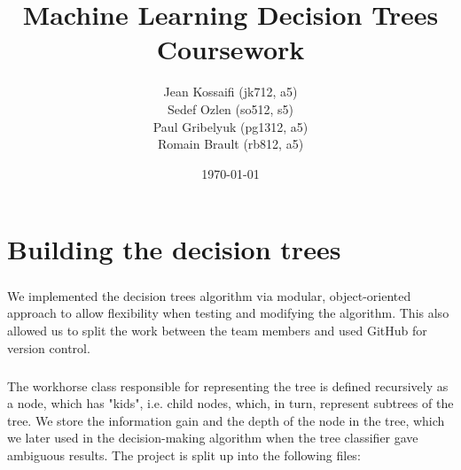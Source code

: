 \documentclass[a4paper,12pt,oneside,final]{report}
\author{Jean Kossaifi (jk712, a5) \\Sedef Ozlen (so512, s5) \\Paul Gribelyuk (pg1312, a5) \\Romain Brault (rb812, a5)}
\title{\Huge Machine Learning Decision Trees Coursework}
\date{\today}
\begin{document}
\maketitle
\tableofcontents
\listoffigures
\chapter{Building the decision trees}
\paragraph{}
We implemented the decision trees algorithm via modular, object-oriented approach to allow flexibility when testing and modifying the algorithm.  This also allowed us to split the work between the team members and used GitHub for version control.
\paragraph{}
The workhorse class responsible for representing the tree is defined recursively as a node, which has "kids", i.e. child nodes, which, in turn, represent subtrees of the tree.  We store the information gain and the depth of the node in the tree, which we later used in the decision-making algorithm when the tree classifier gave ambiguous results.  The project is split up into the following files:
\end{document}

